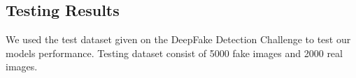 	\subsection*{Testing Results}
	We used the test dataset given on the DeepFake Detection Challenge\cite{jimaging8100263} to test our models performance.
	Testing dataset consist of 5000 fake images and 2000 real images.
	\vspace{1pt}
	\begin{figure}[hbt!]
	\end{figure}


